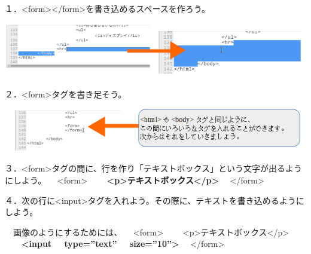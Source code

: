 １．{\textless}form{\textgreater}{\textless}/form{\textgreater}を書き込めるスペースを作ろう。



\centering
\includegraphics[width=\textwidth]{text07-img/ome7-img035.png}
\flushleft

２．{\textless}form{\textgreater}タグを書き足そう。



\centering
\includegraphics[width=\textwidth]{text07-img/ome7-img036.png}
\flushleft


\bigskip


\bigskip

３．{\textless}form{\textgreater}タグの間に、行を作り「テキストボックス」という文字が出るようにしよう。\newline
\ \ {\textless}form{\textgreater}\newline
\ \ \ \ \textbf{{\textless}p{\textgreater}テキストボックス{\textless}/p{\textgreater}}\newline
\ \ {\textless}/form{\textgreater}

\bigskip

\clearpage

４．次の行に{\textless}input{\textgreater}タグを入れよう。その際に、テキストを書き込めるようにしよう。

\ \ 画像のようにするためには、\newline
\ \ {\textless}form{\textgreater}\newline
\ \ \ \ {\textless}p{\textgreater}テキストボックス{\textless}/p{\textgreater}\newline
\ \ \ \ \textbf{{\textless}input \ \ type=”text” \ \ size=”10”{\textgreater}}\newline
\ \ {\textless}/form{\textgreater}

